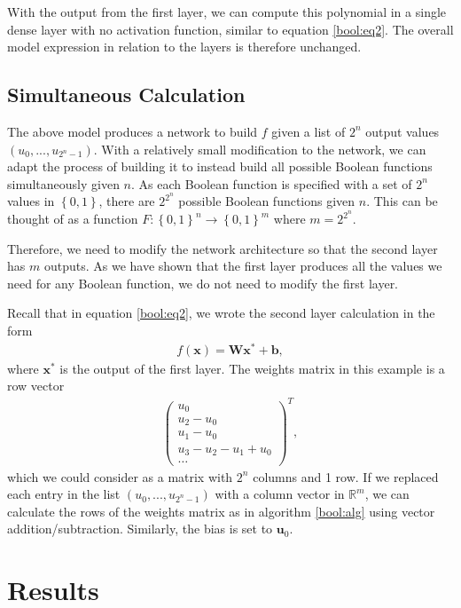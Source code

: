 \documentclass{somasmsc}
\begin{document}
With the output from the first layer, we can compute this polynomial in a single dense layer with no activation function, similar to equation \ref{bool:eq2}. The overall model expression in relation to the layers is therefore unchanged.


\subsection{Simultaneous Calculation}\label{bool:sim}

The above model produces a network to build $f$ given a list of $2^n$ output values $\left(u_0, ..., u_{2^n-1}\right)$. With a relatively small modification to the network, we can adapt the process of building it to instead build all possible Boolean functions simultaneously given $n$. As each Boolean function is specified with a set of $2^n$ values in $\left\{0, 1\right\}$, there are $2^{2^n}$ possible Boolean functions given $n$. This can be thought of as a function $F : \left\{0, 1\right\}^n \rightarrow \left\{0, 1\right\}^m$ where $m=2^{2^n}$.

Therefore, we need to modify the network architecture so that the second layer has $m$ outputs. As we have shown that the first layer produces all the values we need for any Boolean function, we do not need to modify the first layer.

Recall that in equation \ref{bool:eq2}, we wrote the second layer calculation in the form
\begin{align*}
    f(\pmb{x}) = \mathbf{W}\pmb{x}^* + \pmb{b},
\end{align*}
where $\pmb{x}^*$ is the output of the first layer. The weights matrix in this example is a row vector
\begin{align*}
\begin{pmatrix}
    u_0 \\
    u_2 - u_0 \\
    u_1 - u_0 \\
    u_3 - u_2 - u_1 + u_0 \\
    \dots
\end{pmatrix}^T,
\end{align*}
which we could consider as a matrix with $2^n$ columns and 1 row. If we replaced each entry in the list $\left(u_0, ..., u_{2^n-1}\right)$ with a column vector in $\mathbb{R}^m$, we can calculate the rows of the weights matrix as in algorithm \ref{bool:alg} using vector addition/subtraction. Similarly, the bias is set to $\pmb{u}_0$.

\section{Results}
\end{document}
